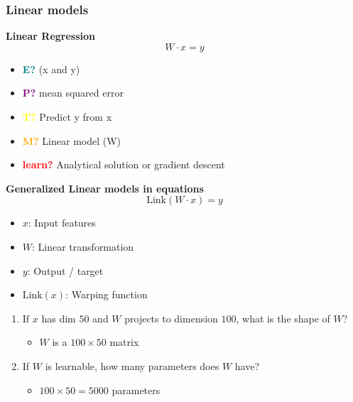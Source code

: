 \documentclass{article}
\begin{document}
\subsubsection{Linear models}
\begin{definition} \textbf{Linear Regression}
    \begin{equation}
        W \cdot x = y
    \end{equation}
    \begin{itemize}
        \item \textcolor{teal}{\textbf{E?}} (x and y)
        \item \textcolor{purple}{\textbf{P?}} mean squared error
        \item \textcolor{yellow}{\textbf{T?}} Predict y from x
        \item \textcolor{orange}{\textbf{M?}} Linear model (W)
        \item \textcolor{red}{\textbf{learn?}} Analytical solution or gradient descent
    \end{itemize}
\end{definition}

\begin{definition} \textbf{Generalized Linear models in equations}
    \begin{equation}
        \text{Link}(W \cdot x) = y
    \end{equation}
    \begin{itemize}
        \item $x$: Input features
        \item $W$: Linear transformation
        \item $y$: Output / target
        \item $\text{Link}(x)$: Warping function
    \end{itemize}
\end{definition}

\begin{example}
    \begin{enumerate}
        \item If $x$ has dim $50$ and $W$ projects to dimension $100$, what is the shape of $W$?
        \begin{itemize}
            \item $W$ is a $100 \times 50$ matrix
        \end{itemize}
        \item If $W$ is learnable, how many parameters does $W$ have?
        \begin{itemize}
            \item $100 \times 50 = 5000$ parameters
        \end{itemize}
    \end{enumerate}
\end{example}
\end{document}
